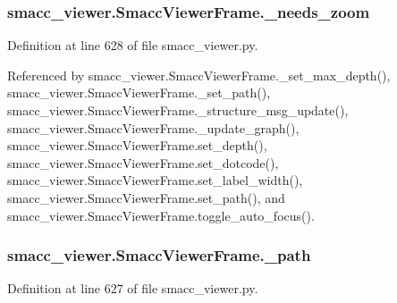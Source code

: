 \subsubsection[{\texorpdfstring{\+\_\+needs\+\_\+zoom}{_needs_zoom}}]{\setlength{\rightskip}{0pt plus 5cm}smacc\+\_\+viewer.\+Smacc\+Viewer\+Frame.\+\_\+needs\+\_\+zoom\hspace{0.3cm}{\ttfamily [private]}}\hypertarget{classsmacc__viewer_1_1SmaccViewerFrame_a2307d88cbcee116cf8a6fa2201aedc44}{}\label{classsmacc__viewer_1_1SmaccViewerFrame_a2307d88cbcee116cf8a6fa2201aedc44}


Definition at line 628 of file smacc\+\_\+viewer.\+py.



Referenced by smacc\+\_\+viewer.\+Smacc\+Viewer\+Frame.\+\_\+set\+\_\+max\+\_\+depth(), smacc\+\_\+viewer.\+Smacc\+Viewer\+Frame.\+\_\+set\+\_\+path(), smacc\+\_\+viewer.\+Smacc\+Viewer\+Frame.\+\_\+structure\+\_\+msg\+\_\+update(), smacc\+\_\+viewer.\+Smacc\+Viewer\+Frame.\+\_\+update\+\_\+graph(), smacc\+\_\+viewer.\+Smacc\+Viewer\+Frame.\+set\+\_\+depth(), smacc\+\_\+viewer.\+Smacc\+Viewer\+Frame.\+set\+\_\+dotcode(), smacc\+\_\+viewer.\+Smacc\+Viewer\+Frame.\+set\+\_\+label\+\_\+width(), smacc\+\_\+viewer.\+Smacc\+Viewer\+Frame.\+set\+\_\+path(), and smacc\+\_\+viewer.\+Smacc\+Viewer\+Frame.\+toggle\+\_\+auto\+\_\+focus().

\subsubsection[{\texorpdfstring{\+\_\+path}{_path}}]{\setlength{\rightskip}{0pt plus 5cm}smacc\+\_\+viewer.\+Smacc\+Viewer\+Frame.\+\_\+path\hspace{0.3cm}{\ttfamily [private]}}\hypertarget{classsmacc__viewer_1_1SmaccViewerFrame_a0e29b01e74edbb322f62e8ab6fdd359a}{}\label{classsmacc__viewer_1_1SmaccViewerFrame_a0e29b01e74edbb322f62e8ab6fdd359a}


Definition at line 627 of file smacc\+\_\+viewer.\+py.



